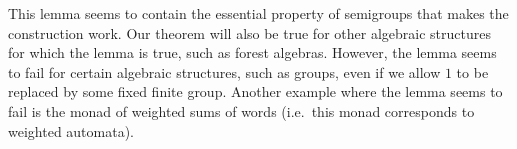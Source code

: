 This lemma seems to contain the essential property of semigroups that makes the construction work. Our theorem will also be true for other algebraic structures for which the lemma is true, such as forest algebras. However, the lemma seems to fail for certain algebraic structures, such as groups, even if we allow $1$ to be replaced by some fixed finite group. Another example where the lemma seems to fail is the monad of weighted sums of words (i.e.~this monad corresponds to weighted automata).
